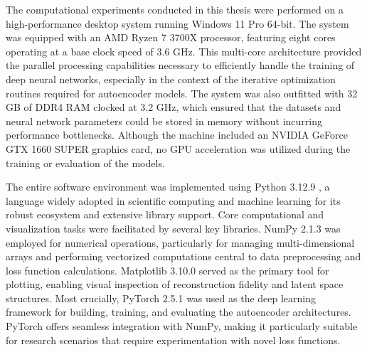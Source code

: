 The computational experiments conducted in this thesis were performed on a high-performance desktop system running Windows 11 Pro 64-bit. The system was equipped with an AMD Ryzen 7 3700X processor, featuring eight cores operating at a base clock speed of 3.6 GHz. This multi-core architecture provided the parallel processing capabilities necessary to efficiently handle the training of deep neural networks, especially in the context of the iterative optimization routines required for autoencoder models. The system was also outfitted with 32 GB of DDR4 RAM clocked at 3.2 GHz, which ensured that the datasets and neural network parameters could be stored in memory without incurring performance bottlenecks. Although the machine included an NVIDIA GeForce GTX 1660 SUPER graphics card, no GPU acceleration was utilized during the training or evaluation of the models.

The entire software environment was implemented using Python 3.12.9 \cite{Python}, a language widely adopted in scientific computing and machine learning for its robust ecosystem and extensive library support. Core computational and visualization tasks were facilitated by several key libraries. NumPy 2.1.3 \cite{NumPy} was employed for numerical operations, particularly for managing multi-dimensional arrays and performing vectorized computations central to data preprocessing and loss function calculations. Matplotlib 3.10.0 \cite{Matplotlib} served as the primary tool for plotting, enabling visual inspection of reconstruction fidelity and latent space structures. Most crucially, PyTorch 2.5.1 \cite{PyTorch} was used as the deep learning framework for building, training, and evaluating the autoencoder architectures. PyTorch offers seamless integration with NumPy, making it particularly suitable for research scenarios that require experimentation with novel loss functions.
